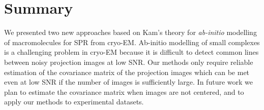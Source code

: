 \documentclass{article}
\begin{document}
\section{Summary}
We presented two new approaches based on Kam's theory for {\em ab-initio} modelling of macromolecules for SPR from cryo-EM.  
Ab-initio modelling of small complexes is a challenging problem in cryo-EM because it is difficult to detect common lines between noisy projection images at low SNR. 
Our methods only require reliable estimation of the covariance matrix of the projection images which can be met even at low SNR if the number of images is sufficiently large.    
In future work we plan to estimate the covariance matrix when images are not centered, and to apply our methods to experimental datasets.




\end{document}
